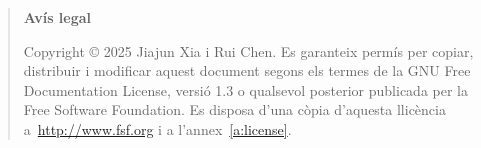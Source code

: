 \pagebreak

\vspace*{16truecm}

	\begin{quote}
	\textbf{Avís legal}

	  Copyright \copyright{}  2025 Jiajun Xia i Rui Chen.
	  Es garanteix permís per copiar, distribuir i modificar aquest document segons els termes de la GNU Free Documentation License, versió 1.3 o qualsevol posterior publicada per la Free Software Foundation. Es disposa d'una còpia d'aquesta llicència a~\href{http://www.fsf.org}{http://www.fsf.org} i a l'annex~\ref{a:license}.
	\end{quote}





\endinput
